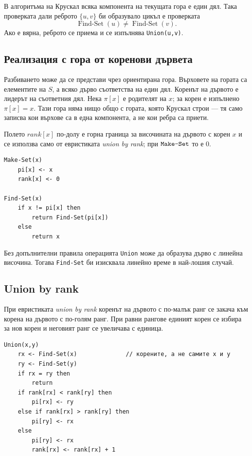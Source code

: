 В алгоритъма на Крускал всяка компонента на текущата гора е един дял. Така проверката дали реброто $\{u,v\}$ би образувало цикъл е проверката
\[
\operatorname{Find\mbox{-}Set}(u)
\neq
\operatorname{Find\mbox{-}Set}(v).
\]
Ако е вярна, реброто се приема и се изпълнява \verb|Union(u,v)|.

\subsection{Реализация с гора от коренови дървета}\label{s:7.5.1}

Разбиването може да се представи чрез ориентирана гора. Върховете на гората са елементите на $S$, а всяко дърво съответства на един дял. Коренът на дървото е лидерът на съответния дял. Нека $\pi[x]$ е родителят на $x$; за корен е изпълнено $\pi[x]=x$. Тази гора няма нищо общо с гората, която Крускал строи --- тя само записва кои върхове са в една компонента, а не кои ребра са приети.

Полето $\mathit{rank}[x]$ по-долу е горна граница за височината на дървото с корен $x$ и се използва само от евристиката \emph{union by rank}; при $\verb|Make-Set|$ то е $0$.

\begin{verbatim}
Make-Set(x)
    pi[x] <- x
    rank[x] <- 0

Find-Set(x)
    if x != pi[x] then
        return Find-Set(pi[x])
    else
        return x
\end{verbatim}

Без допълнителни правила операцията \verb|Union| може да образува дърво с линейна височина. Тогава \verb|Find-Set| би изисквала линейно време в най-лошия случай.

\subsection{Union by rank}\label{s:7.5.2}

\begin{defn}
При евристиката \emph{union by rank} коренът на дървото с по-малък ранг се закача към корена на дървото с по-голям ранг. При равни рангове единият корен се избира за нов корен и неговият ранг се увеличава с единица.
\end{defn}

\begin{verbatim}
Union(x,y)
    rx <- Find-Set(x)              // корените, а не самите x и y
    ry <- Find-Set(y)
    if rx = ry then
        return
    if rank[rx] < rank[ry] then
        pi[rx] <- ry
    else if rank[rx] > rank[ry] then
        pi[ry] <- rx
    else
        pi[ry] <- rx
        rank[rx] <- rank[rx] + 1
\end{verbatim}

